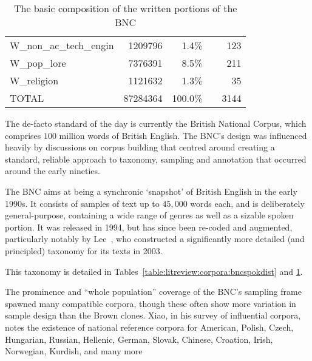 \begin{table}[Ht]
\begin{tabular}{lrrcr}
        W\_non\_ac\_tech\_engin            & 1209796  & 1.4\%   &                                                         & 123   \\ \cline{4-4}
        W\_pop\_lore                       & 7376391  & 8.5\%   &                                                         & 211   \\
        W\_religion                        & 1121632  & 1.3\%   &                                                         & 35    \\ \hline
        TOTAL                              & 87284364 & 100.0\% &                                                         & 3144  \\ \hline
    \end{tabular}

    \caption{The basic composition of the written portions of the BNC}
    \label{table:litreview:corpora:bncwritdist}
\end{table}




The de-facto standard of the day is currently the British National Corpus, which comprises $100$ million words of British English\cite{leech1993100}.  The BNC's design was influenced heavily by discussions on corpus building that centred around creating a standard, reliable approach to taxonomy, sampling and annotation that occurred around the early nineties.

The BNC aims at being a synchronic `snapshot' of British English in the early 1990s.  It consists of samples of text up to $45,000$ words each, and is deliberately general-purpose, containing a wide range of genres as well as a sizable spoken portion.  It was released in 1994, but has since been re-coded and augmented, particularly notably by Lee~\cite{lee2003bnc}, who constructed a significantly more detailed (and principled) taxonomy for its texts in 2003.

This taxonomy is detailed in Tables~\ref{table:litreview:corpora:bncspokdist} and \ref{table:litreview:corpora:bncwritdist}.

The prominence and ``whole population'' coverage of the BNC's sampling frame spawned many compatible corpora, though these often show more variation in sample design than the Brown clones.  Xiao, in his survey of influential corpora, notes the existence of national reference corpora for American, Polish, Czech, Hungarian, Russian, Hellenic, German, Slovak, Chinese, Croation, Irish, Norwegian, Kurdish, and many more\cite{}%

